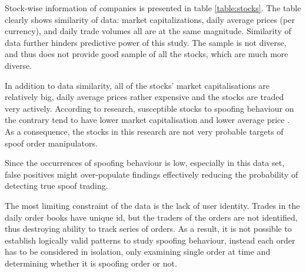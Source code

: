 \documentclass{tut-thesis}
\begin{document}

Stock-wise information of companies is presented in table \ref{table:stocks}. The table clearly shows similarity of data: market capitalizations, daily average prices (per currency), and daily trade volumes all are at the same magnitude. Similarity of data further hinders predictive power of this study. The sample is not diverse, and thus does not provide good sample of all the stocks, which are much more diverse.

In addition to data similarity, all of the stocks' market capitalisations are relatively big, daily average prices rather expensive and the stocks are traded very actively. According to research, susceptible stocks to spoofing behaviour on the contrary tend to have lower market capitalisation and lower average price \autocite{LeeEomPark2009, AggarwalWu2006, MeiWuZhou2004}. As a consequence, the stocks in this research are not very probable targets of spoof order manipulators. 

Since the occurrences of spoofing behaviour is low, especially in this data set, false positives might over-populate findings effectively reducing the probability of detecting true spoof trading.

The most limiting constraint of the data is the lack of user identity. Trades in the daily order books have unique id, but the traders of the orders are not identified, thus destroying ability to track series of orders. As a result, it is not possible to establish logically valid patterns to study spoofing behaviour, instead each order has to be considered in isolation, only examining single order at time and determining whether it is spoofing order or not. 
\end{document}
